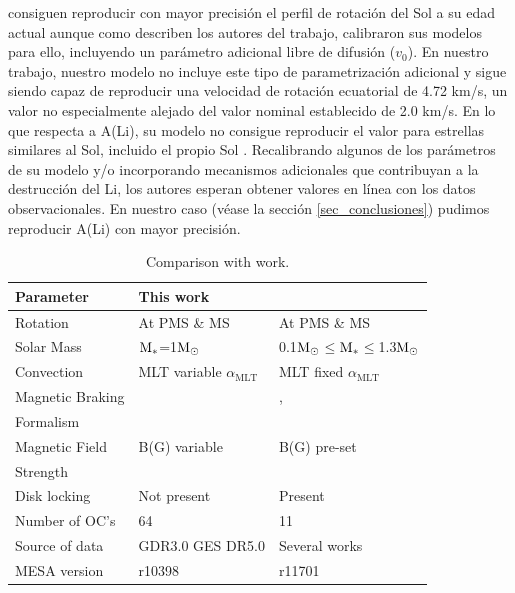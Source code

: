 \cite{Gossage2021} consiguen reproducir con mayor precisión el perfil de rotación del Sol a su edad actual \cite[ver][panel (a) de las Figuras 2, 4 \& 6]{Gossage2021} aunque como describen los autores del trabajo, calibraron sus modelos para ello, incluyendo un parámetro adicional libre de difusión ($v_0$). En nuestro trabajo, nuestro modelo no incluye este tipo de parametrización adicional y sigue siendo capaz de reproducir una velocidad de rotación ecuatorial de 4.72 km/s, un valor no especialmente alejado del valor nominal establecido de 2.0 km/s. En lo que respecta a A(Li), su modelo no consigue reproducir el valor para estrellas similares al Sol, incluido el propio Sol \cite[ver][panel (d) en las Figuras 2 \& 4, y (b) en la Figura 6]{Gossage2021}. Recalibrando algunos de los parámetros de su modelo y/o incorporando mecanismos adicionales que contribuyan a la destrucción del Li, los autores esperan obtener valores en línea con los datos observacionales. En nuestro caso (véase la sección \ref{sec_conclusiones}) pudimos reproducir A(Li) con mayor precisión.

\begin{table}
	\centering
	\begin{threeparttable}
		\begin{tabular}{lll} 
			\hline
			Parameter & This work & \cite{Gossage2021}\\
			\hline
			
			Rotation & At PMS \& MS & At PMS \& MS\\
			Solar Mass & $\mathrm{M}_*$=1$\mathrm{M}_\odot$ & 0.1$\mathrm{M}_\odot$$\le$$\mathrm{M}_*$$\le$1.3$\mathrm{M}_\odot$ \\
			Convection & MLT variable $\alpha_{\textrm{MLT}}$ & MLT fixed $\alpha_{\textrm{MLT}}$\\
			Magnetic Braking & \cite{Gallet2013} & \cite{Matt2015}, \\ Formalism & & \cite{Garraffo2018}\\
			Magnetic Field & B(G) variable & B(G) pre-set\\ Strength & & \\
			Disk locking & Not present & Present\\
			Number of OC's & 64 & 11 \\
			Source of data & GDR3.0 GES DR5.0 & Several works \\
			MESA version & r10398 & r11701\\
			\hline
		\end{tabular}
	\end{threeparttable}
	\caption{Comparison with \cite{Gossage2021} work.}
	\label{tab:gassage_vs_navarro}    
\end{table}

